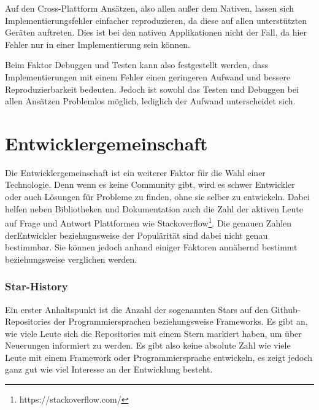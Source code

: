 Auf den Cross-Plattform Ansätzen, also allen außer dem Nativen, lassen sich Implementierungsfehler einfacher reproduzieren, da diese auf allen unterstützten Geräten auftreten. Dies ist bei den nativen Applikationen nicht der Fall, da hier Fehler nur in einer Implementierung sein können.

Beim Faktor Debuggen und Testen kann also festgestellt werden, dass Implementierungen mit einem Fehler einen geringeren Aufwand und bessere Reproduzierbarkeit bedeuten. Jedoch ist sowohl das Testen und Debuggen bei allen Ansätzen Problemlos möglich, lediglich der Aufwand unterscheidet sich.

\section{Entwicklergemeinschaft}
Die Entwicklergemeinschaft ist ein weiterer Faktor für die Wahl einer Technologie. Denn wenn es keine Community gibt, wird es schwer Entwickler oder auch Lösungen für Probleme zu finden, ohne sie selber zu entwickeln. Dabei helfen neben Bibliotheken und Dokumentation auch die Zahl der aktiven Leute auf Frage und Antwort Plattformen wie Stackoverflow\footnote{https://stackoverflow.com/}.  Die genauen Zahlen derEntwickler beziehugnsweise der Populärität sind dabei nicht genau bestimmbar. Sie können jedoch anhand einiger Faktoren annähernd bestimmt beziehungsweise verglichen werden.

\subsubsection{Star-History}
Ein erster Anhaltspunkt ist die Anzahl der sogenannten Stars auf den Github-Repositories der Programmiersprachen beziehungsweise Frameworks. Es gibt an, wie viele Leute sich die Repositories mit einem Stern markiert haben, um über Neuerungen informiert zu werden. Es gibt also keine absolute Zahl wie viele Leute mit einem Framework oder Programmiersprache entwickeln, es zeigt jedoch ganz gut wie viel Interesse an der Entwicklung besteht.

